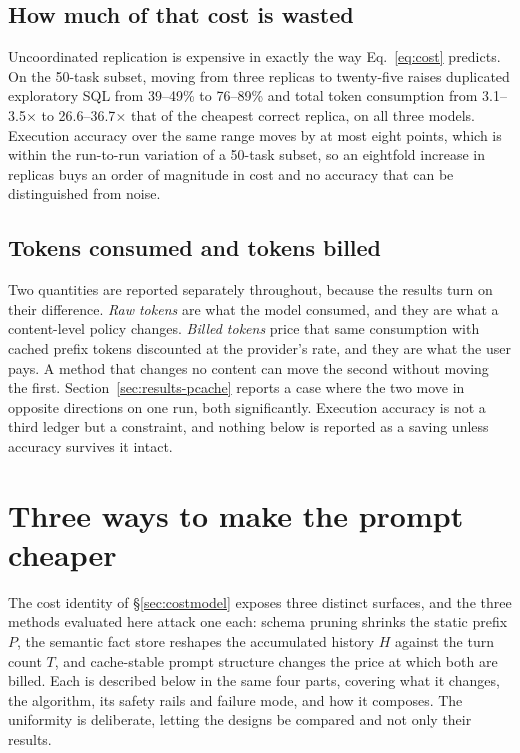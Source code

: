 \documentclass[conference]{IEEEtran}
\begin{document}
\subsection{How much of that cost is wasted}\label{sec:waste}

Uncoordinated replication is expensive in exactly the way Eq.~\ref{eq:cost}
predicts. On the 50-task subset, moving from three replicas to twenty-five
raises duplicated exploratory SQL from 39--49\% to 76--89\% and total token
consumption from 3.1--3.5$\times$ to 26.6--36.7$\times$ that of the cheapest
correct replica, on all three models. Execution accuracy over the same range moves by at
most eight points, which is within the run-to-run variation of a 50-task subset,
so an eightfold increase in replicas buys an order of magnitude in cost and no
accuracy that can be distinguished from noise.

\subsection{Tokens consumed and tokens billed}\label{sec:ledgers}

Two quantities are reported separately throughout, because the results turn on
their difference. \emph{Raw tokens} are what the model consumed, and they are
what a content-level policy changes. \emph{Billed tokens} price that same
consumption with cached prefix tokens discounted at the provider's rate, and
they are what the user pays. A method that changes no content can move the
second without moving the first. Section~\ref{sec:results-pcache} reports a case
where the two move in opposite directions on one run, both significantly.
Execution accuracy is not a third ledger but a constraint, and nothing below is
reported as a saving unless accuracy survives it intact.

\section{Three ways to make the prompt cheaper}\label{sec:methods}

The cost identity of §\ref{sec:costmodel} exposes three distinct surfaces, and
the three methods evaluated here attack one each: schema pruning shrinks the
static prefix $P$, the semantic fact store reshapes the accumulated history $H$
against the turn count $T$, and cache-stable prompt structure changes the price
at which both are billed. Each is described below in the same four parts, covering what it changes,
the algorithm, its safety rails and failure mode, and how it composes. The
uniformity is deliberate, letting the designs be compared and not only their
results.
\end{document}

